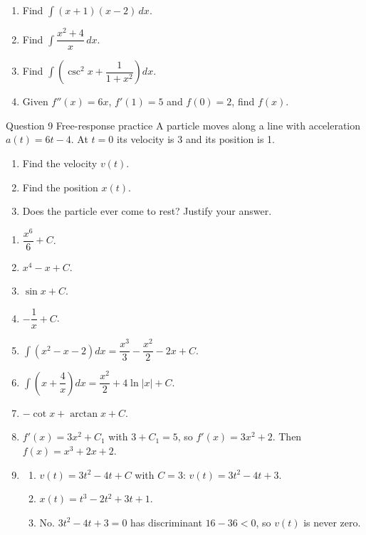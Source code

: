 \documentclass[11pt]{article}
\begin{document}
\begin{enumerate}[leftmargin=*,itemsep=2pt,start=5]
  \item Find $\displaystyle\int(x+1)(x-2)\,dx$.\work{2.8cm}
  \item Find $\displaystyle\int\dfrac{x^2+4}{x}\,dx$.\work{2.8cm}
  \item Find $\displaystyle\int\left(\csc^2x+\dfrac{1}{1+x^2}\right)dx$.\work{2.8cm}
  \item Given $f''(x)=6x$, $f'(1)=5$ and $f(0)=2$, find $f(x)$.\work{2.8cm}
\end{enumerate}

\begin{frbox}{Question 9 \textperiodcentered{} Free-response practice}
A particle moves along a line with acceleration $a(t)=6t-4$. At $t=0$ its velocity is 3 and its position is 1.
\begin{enumerate}[label=(\alph*),leftmargin=*,itemsep=2pt]
  \item Find the velocity $v(t)$.\work{2.6cm}
  \item Find the position $x(t)$.\work{2.6cm}
  \item Does the particle ever come to rest? Justify your answer.\work{2.6cm}
\end{enumerate}
\end{frbox}

\newpage
\begin{solbox}
\begin{enumerate}[leftmargin=*,itemsep=4pt]
  \item $\dfrac{x^6}{6}+C$.
  \item $x^4-x+C$.
  \item $\sin x+C$.
  \item $-\dfrac1x+C$.
  \item $\displaystyle\int\left(x^2-x-2\right)dx=\dfrac{x^3}{3}-\dfrac{x^2}{2}-2x+C$.
  \item $\displaystyle\int\left(x+\dfrac4x\right)dx=\dfrac{x^2}{2}+4\ln|x|+C$.
  \item $-\cot x+\arctan x+C$.
  \item $f'(x)=3x^2+C_1$ with $3+C_1=5$, so $f'(x)=3x^2+2$. Then $f(x)=x^3+2x+2$.
  \item \begin{enumerate}[label=(\alph*),leftmargin=*,itemsep=3pt]
    \item $v(t)=3t^2-4t+C$ with $C=3$: $v(t)=3t^2-4t+3$.
    \item $x(t)=t^3-2t^2+3t+1$.
    \item No. $3t^2-4t+3=0$ has discriminant $16-36<0$, so $v(t)$ is never zero.
  \end{enumerate}
\end{enumerate}
\end{solbox}
\end{document}
